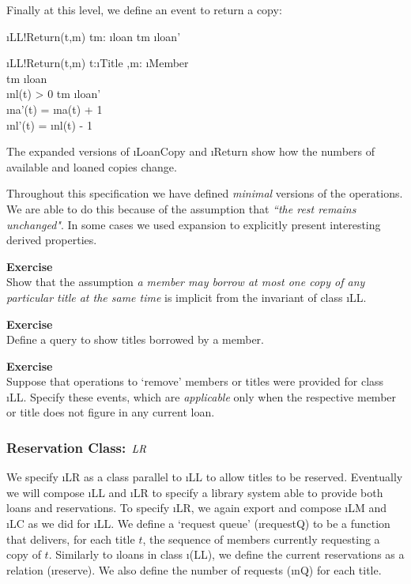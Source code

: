 \documentclass[12pt,a4paper]{article}
\newcounter{exer} %
\newcommand{\exer} %
	{\stepcounter{exer}{\;\arabic{exer}}}
\begin{document}
\medskip\noindent Finally at this level, we define an event to return a copy:
\begin{showspecs}
	\begin{spec}{\i{LL!Return(t,m)}}
		t\mapsto m: \i{loan}
	\post	t\mapsto m \notin \i{loan'}
	\end{spec}
\showbeside
	\begin{spec}[\equiv]{\i{LL!Return(t,m)}}
		t:\i{Title} \sep m: \i{Member}\\
		t\mapsto m \in \i{loan}\\
        \i{nl}(t) > 0
	\post	t\mapsto m \notin \i{loan'}\\
		\i{na'}(t) = \i{na}(t) + 1\\
		\i{nl'}(t) = \i{nl}(t) - 1
	\end{spec}
\end{showspecs}

\smallskip\noindent The expanded versions of \i{LoanCopy} and \i{Return}
show how the numbers of available and loaned copies change.

\smallskip\noindent
Throughout this specification we have defined \emph{minimal} versions of the operations.
We are able to do this because of the assumption that \emph{``the rest remains unchanged"}.
In some cases we used expansion to explicitly present interesting derived properties.

\medskip\noindent
\textbf{Exercise}\exer\\
Show that the assumption \emph{a member may borrow at most one copy of any particular title at the same time}
is implicit from the invariant of class \i{LL}.

\medskip\noindent
\textbf{Exercise}\exer\\
Define a query to show titles borrowed by a member.

\medskip\noindent
\textbf{Exercise}\exer\\
Suppose that operations to `remove' members or titles were provided for class \i{LL}.
Specify these events, which are \emph{applicable} only when the respective member or title does not figure in any current loan.
%
\newpage
\subsubsection*{Reservation Class: $\mathit{LR}$}

We specify \i{LR} as a class parallel to \i{LL} to allow titles to be reserved.
Eventually we will compose \i{LL} and \i{LR} to specify a library system able to provide both loans and reservations.
To specify \i{LR}, we again export and compose \i{LM} and \i{LC} as we did for \i{LL}.
We define a `request queue' (\i{requestQ}) to be a function that delivers,
for each title $t$, the sequence of members currently requesting a copy of $t$.
Similarly to \i{loans} in class \i(LL), we define the current reservations as a relation (\i{reserve}).
We also define the number of requests (\i{nQ}) for each title.
\end{document}
